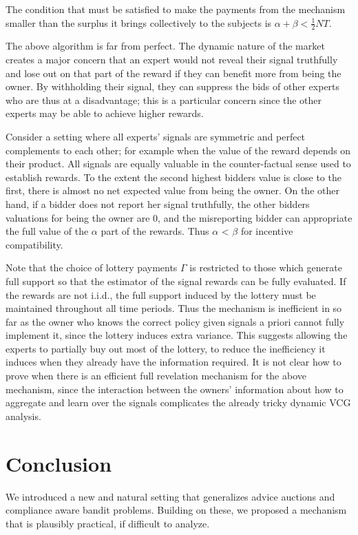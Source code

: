 The condition that must be satisfied to make the payments from the mechanism smaller than the surplus it brings collectively to the subjects is $ \alpha + \beta < \frac{1}{2}NT$.


The above algorithm is far from perfect.
The dynamic nature of the market creates a major concern that an expert would not reveal their signal truthfully and lose out on that part of the reward if they can benefit more from being the owner.
By withholding their signal, they can suppress the bids of other experts who are thus at a disadvantage; this is a particular concern since the other experts may be able to achieve higher rewards.

Consider a setting where all experts' signals are symmetric and perfect complements to each other; for example when the value of the reward depends on their product.
All signals are equally valuable in the counter-factual sense used to establish rewards.
To the extent the second highest bidders value is close to the first, there is almost no net expected value from being the owner.
On the other hand, if a bidder does not report her signal truthfully, the other bidders valuations for being the owner are 0, and the misreporting bidder can appropriate the full value of the $\alpha$ part of the rewards.
Thus $\alpha$ < $\beta$ for incentive compatibility. 

Note that the choice of lottery payments $\Gamma$ is restricted to those which generate full support so that the estimator of the signal rewards can be fully evaluated. 
If the rewards are not i.i.d., the full support induced by the lottery must be maintained throughout all time periods. 
Thus the mechanism is inefficient in so far as the owner who knows the correct policy given signals a priori cannot fully implement it, since the lottery induces extra variance.
This suggests allowing the experts to partially buy out most of the lottery, to reduce the inefficiency it induces when they already have the information required. 
It is not clear how to prove when there is an efficient full revelation mechanism for the above mechanism, since the interaction between the owners' information about how to aggregate and learn over the signals complicates the already tricky dynamic VCG analysis. 


\section{Conclusion}

We introduced a new and natural setting that generalizes advice auctions and compliance aware bandit problems.
Building on these, we proposed a mechanism that is plausibly practical, if difficult to analyze.




